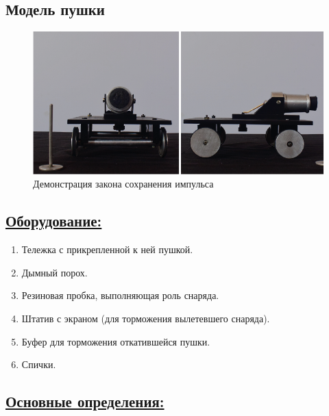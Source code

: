 \documentclass[14pt,a4paper,oneside]{extarticle}	%
\begin{document}

\begin{center}
	\subsection*{Модель пушки}
\end{center}

\begin{figure}[H] 
	\centering 	
	\includegraphics[width=1\linewidth]{cannon-1.png}
	\caption{Демонстрация  закона сохранения импульса}
	\label{cannon-1}
\end{figure}


\subsection*{\underline{Оборудование:}}

\begin{enumerate}
	\item Тележка с прикрепленной к ней пушкой.
	\item Дымный порох.
	\item Резиновая пробка, выполняющая роль снаряда.
	\item Штатив с экраном (для торможения вылетевшего снаряда).
	\item Буфер для торможения откатившейся пушки.
	\item Спички.
\end{enumerate}

\newpage
\subsection*{\underline{Основные определения:}}
\end{document}
